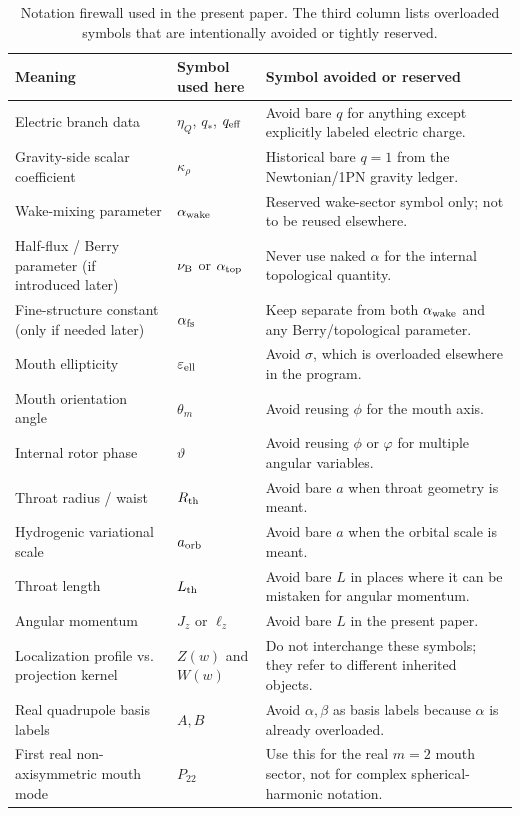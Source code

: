 \documentclass[11pt]{article}
\theoremstyle{plain}
\theoremstyle{definition}
\theoremstyle{remark}
\newcommand{\Ptwotwo}{P_{22}}
\begin{document}
\begin{table}[t]
\centering
\caption{Notation firewall used in the present paper. The third column lists overloaded symbols that are intentionally avoided or tightly reserved.}
\label{tab:notation-firewall}
\begin{tabularx}{\textwidth}{@{}>{\raggedright\arraybackslash}p{} >{\raggedright\arraybackslash}p{} X@{}}
\toprule
Meaning & Symbol used here & Symbol avoided or reserved \\
\midrule
Electric branch data & $\eta_Q$, $q_*$, $q_{\rm eff}$ & Avoid bare $q$ for anything except explicitly labeled electric charge. \\
Gravity-side scalar coefficient & $\kappa_{\rho}$ & Historical bare $q=1$ from the Newtonian/1PN gravity ledger. \\
Wake-mixing parameter & $\alpha_{\rm wake}$ & Reserved wake-sector symbol only; not to be reused elsewhere. \\
Half-flux / Berry parameter (if introduced later) & $\nu_{\rm B}$ or $\alpha_{\rm top}$ & Never use naked $\alpha$ for the internal topological quantity. \\
Fine-structure constant (only if needed later) & $\alpha_{\rm fs}$ & Keep separate from both $\alpha_{\rm wake}$ and any Berry/topological parameter. \\
Mouth ellipticity & $\varepsilon_{\rm ell}$ & Avoid $\sigma$, which is overloaded elsewhere in the program. \\
Mouth orientation angle & $\theta_m$ & Avoid reusing $\phi$ for the mouth axis. \\
Internal rotor phase & $\vartheta$ & Avoid reusing $\phi$ or $\varphi$ for multiple angular variables. \\
Throat radius / waist & $R_{\rm th}$ & Avoid bare $a$ when throat geometry is meant. \\
Hydrogenic variational scale & $a_{\rm orb}$ & Avoid bare $a$ when the orbital scale is meant. \\
Throat length & $L_{\rm th}$ & Avoid bare $L$ in places where it can be mistaken for angular momentum. \\
Angular momentum & $J_z$ or $\ell_z$ & Avoid bare $L$ in the present paper. \\
Localization profile vs.
projection kernel & $Z(w)$ and $W(w)$ & Do not interchange these symbols; they refer to different inherited objects. \\
Real quadrupole basis labels & $A,B$ & Avoid $\alpha,\beta$ as basis labels because $\alpha$ is already overloaded. \\
First real non-axisymmetric mouth mode & $\Ptwotwo$ & Use this for the real $m=2$ mouth sector, not for complex spherical-harmonic notation. \\
\bottomrule
\end{tabularx}
\end{table}
\end{document}
